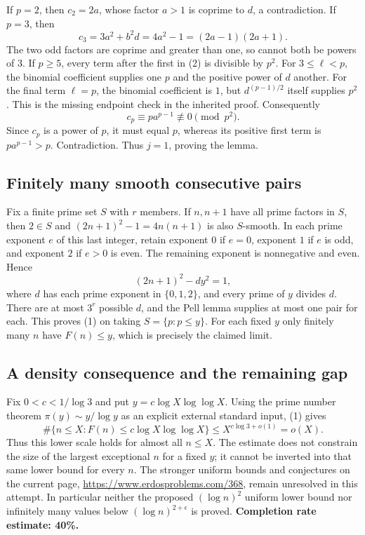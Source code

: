 If $p=2$, then $c_2=2a$, whose factor $a>1$ is coprime to $d$, a contradiction. If $p=3$, then
\[
 c_3=3a^2+b^2d=4a^2-1=(2a-1)(2a+1).
\]
The two odd factors are coprime and greater than one, so cannot both be powers of $3$.
If $p\ge5$, every term after the first in (2) is divisible by $p^2$. For $3\le\ell<p$, the binomial coefficient supplies one $p$ and the positive power of $d$ another. For the final term $\ell=p$, the binomial coefficient is $1$, but $d^{(p-1)/2}$ itself supplies $p^2$. This is the missing endpoint check in the inherited proof. Consequently
\[
 c_p\equiv p a^{p-1}\not\equiv0\pmod{p^2}.
\]
Since $c_p$ is a power of $p$, it must equal $p$, whereas its positive first term is $p a^{p-1}>p$. Contradiction. Thus $j=1$, proving the lemma.

\subsection*{Finitely many smooth consecutive pairs}
Fix a finite prime set $S$ with $r$ members. If $n,n+1$ have all prime factors in $S$, then $2\in S$ and $(2n+1)^2-1=4n(n+1)$ is also $S$-smooth. In each prime exponent $e$ of this last integer, retain exponent $0$ if $e=0$, exponent $1$ if $e$ is odd, and exponent $2$ if $e>0$ is even. The remaining exponent is nonnegative and even. Hence
\[
 (2n+1)^2-dy^2=1,
\]
where $d$ has each prime exponent in $\{0,1,2\}$, and every prime of $y$ divides $d$. There are at most $3^r$ possible $d$, and the Pell lemma supplies at most one pair for each. This proves (1) on taking $S=\{p:p\le y\}$. For each fixed $y$ only finitely many $n$ have $F(n)\le y$, which is precisely the claimed limit.

\subsection*{A density consequence and the remaining gap}
Fix $0<c<1/\log3$ and put $y=c\log X\log\log X$. Using the prime number theorem $\pi(y)\sim y/\log y$ as an explicit external standard input, (1) gives
\[
 \#\{n\le X:F(n)\le c\log X\log\log X\}
 \le X^{c\log3+o(1)}=o(X).
\]
Thus this lower scale holds for almost all $n\le X$. The estimate does not constrain the size of the largest exceptional $n$ for a fixed $y$; it cannot be inverted into that same lower bound for every $n$. The stronger uniform bounds and conjectures on the current page, \url{https://www.erdosproblems.com/368}, remain unresolved in this attempt. In particular neither the proposed $(\log n)^2$ uniform lower bound nor infinitely many values below $(\log n)^{2+\epsilon}$ is proved.
\textbf{Completion rate estimate: 40\%.}
